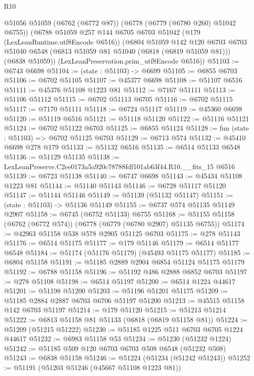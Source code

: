\begin{lexlean}{R10}
\begin{coremodule}
  @51056
    @51059
    (@6762 (@6772 @87))
    (@6778 (@6779 (@6780 @260) @51042 @6755))
    (@6788
      @51059
      @257
      @144
      @6705
      @6703
      @51042
      (@179 (LexLeanRuntime.utf8Encode @6516))
      (@6804
        @51059
        @142
        @120
        @6703
        @6703
        @51040
        @6548
        (@6813 @51059 @81 @51040 (@6818 (@6819 @51059 @81)))
        (@6838 @51059))
      (LexLeanPreservation.prim_utf8Encode @6516))
@51103 := @6743 @6698
@51104 := (state : @51103) -> @6699
@51105 := @6855 @6703
@51106 := @6702 @51105
@51107 := @45377 @6698
@51108 := @51107 @6516
@51111 := @45376 @51108 @1223 @81
@51112 := @7167 @51111
@51113 := @51106 @51112
@51115 := @6702 @51113 @6705
@51116 := @6702 @51115
@51117 := @7170 @51111
@51118 := @6724 @51117
@51119 := @45360 @6698
@51120 := @51119 @6516
@51121 := @51118 @51120
@51122 := @51116 @51121
@51124 := @6702 @51122 @6703
@51125 := @6855 @51124
@51128 := fun (state : @51103) => @6702 @51125 @6703
@51129 := @6713 @574
@51132 := @45410 @6698 @278 @179
@51133 := @51132 @6516
@51135 := @6514 @51133 @6548
@51136 := @51129 @51135
@51138 := LexLeanPreserve.C2ee0173a5a920c78788fdf101ab63f44.R10.__fits_15 @6516
@51139 := @6723 @51138
@51140 := @6747 @6698
@51143 := @45434 @51108 @1223 @81
@51144 := @51140 @51143
@51146 := @6728 @51117 @51120
@51147 := @51144 @51146
@51149 := @51139 (@51132 @51147)
@51151 := (state : @51103) -> @51136 @51149
@51155 := @6737 @574 @51135 @51149 @2907
@51158 := @6745 (@6752 @51133) @6755
@51168 := @51155 @51158 (@6762 (@6772 @574)) (@6778 (@6779 (@6780 @2907) @51135 @6755))
@51174 := @42963 @51158 @538 @578 @2905 @51125 @6703
@51175 := @278 @51143
@51176 := @6514 @51175
@51177 := @179 @51146
@51179 := @6514 @51177 @6548
@51184 := @51174 (@51176 @51179) (@45493 @51175 @51177)
@51185 := @6804 @51158
@51191 := @51185 @2889 @2904 @6854 @51124 @51175 @51179
@51192 := @6788 @51158
@51196 := @51192 @486 @2888 @6852 @6703
@51197 := @278 @51108
@51198 := @6514 @51197
@51200 := @6514 @1224 @44617
@51201 := @51198 @51200
@51203 := @51196 @51201 @51175
@51209 := @51185 @2884 @2887 @6703 @6706 @51197 @51200
@51213 := @45515 @51158 @142 @6703 @51197
@51214 := @179 @51120
@51215 := @51213 @51214
@51222 := @6813 @51158 @81 @51133 (@6818 (@6819 @51158 @81))
@51224 := @51209 (@51215 @51222)
@51230 := @51185 @1225 @511 @6703 @6705 @1224 @44617
@51232 := @6983 @51158 @53
@51234 := @51230 (@51232 @1224)
@51242 := @51185 @509 @120 @6703 @6703 @508 @6548 (@51232 @508)
@51243 := @6838 @51158
@51246 := @51224 (@51234 (@51242 @51243))
@51252 := @51191 (@51203 @51246 (@45667 @51108 @1223 @81))

\end{coremodule}
\end{lexlean}

